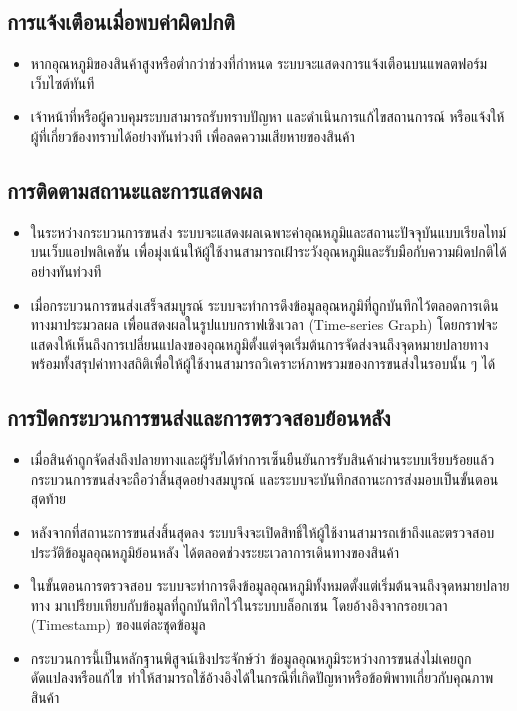 \subsection{การแจ้งเตือนเมื่อพบค่าผิดปกติ}
\begin{itemize}
    \item หากอุณหภูมิของสินค้าสูงหรือต่ำกว่าช่วงที่กำหนด ระบบจะแสดงการแจ้งเตือนบนแพลตฟอร์มเว็บไซต์ทันที
    \item เจ้าหน้าที่หรือผู้ควบคุมระบบสามารถรับทราบปัญหา และดำเนินการแก้ไขสถานการณ์ หรือแจ้งให้ผู้ที่เกี่ยวข้องทราบได้อย่างทันท่วงที เพื่อลดความเสียหายของสินค้า
\end{itemize}

\subsection{การติดตามสถานะและการแสดงผล}
\begin{itemize}
    \item ในระหว่างกระบวนการขนส่ง ระบบจะแสดงผลเฉพาะค่าอุณหภูมิและสถานะปัจจุบันแบบเรียลไทม์บนเว็บแอปพลิเคชัน เพื่อมุ่งเน้นให้ผู้ใช้งานสามารถเฝ้าระวังอุณหภูมิและรับมือกับความผิดปกติได้อย่างทันท่วงที
    \item เมื่อกระบวนการขนส่งเสร็จสมบูรณ์ ระบบจะทำการดึงข้อมูลอุณหภูมิที่ถูกบันทึกไว้ตลอดการเดินทางมาประมวลผล เพื่อแสดงผลในรูปแบบกราฟเชิงเวลา (Time-series Graph) โดยกราฟจะแสดงให้เห็นถึงการเปลี่ยนแปลงของอุณหภูมิตั้งแต่จุดเริ่มต้นการจัดส่งจนถึงจุดหมายปลายทาง พร้อมทั้งสรุปค่าทางสถิติเพื่อให้ผู้ใช้งานสามารถวิเคราะห์ภาพรวมของการขนส่งในรอบนั้น ๆ ได้
\end{itemize}

\subsection{การปิดกระบวนการขนส่งและการตรวจสอบย้อนหลัง}
\begin{itemize}
    \item เมื่อสินค้าถูกจัดส่งถึงปลายทางและผู้รับได้ทำการเซ็นยืนยันการรับสินค้าผ่านระบบเรียบร้อยแล้ว กระบวนการขนส่งจะถือว่าสิ้นสุดอย่างสมบูรณ์ และระบบจะบันทึกสถานะการส่งมอบเป็นขั้นตอนสุดท้าย
    \item หลังจากที่สถานะการขนส่งสิ้นสุดลง ระบบจึงจะเปิดสิทธิ์ให้ผู้ใช้งานสามารถเข้าถึงและตรวจสอบประวัติข้อมูลอุณหภูมิย้อนหลัง ได้ตลอดช่วงระยะเวลาการเดินทางของสินค้า
    \item ในขั้นตอนการตรวจสอบ ระบบจะทำการดึงข้อมูลอุณหภูมิทั้งหมดตั้งแต่เริ่มต้นจนถึงจุดหมายปลายทาง มาเปรียบเทียบกับข้อมูลที่ถูกบันทึกไว้ในระบบบล็อกเชน โดยอ้างอิงจากรอยเวลา (Timestamp) ของแต่ละชุดข้อมูล
    \item กระบวนการนี้เป็นหลักฐานพิสูจน์เชิงประจักษ์ว่า ข้อมูลอุณหภูมิระหว่างการขนส่งไม่เคยถูกดัดแปลงหรือแก้ไข ทำให้สามารถใช้อ้างอิงได้ในกรณีที่เกิดปัญหาหรือข้อพิพาทเกี่ยวกับคุณภาพสินค้า
\end{itemize}

